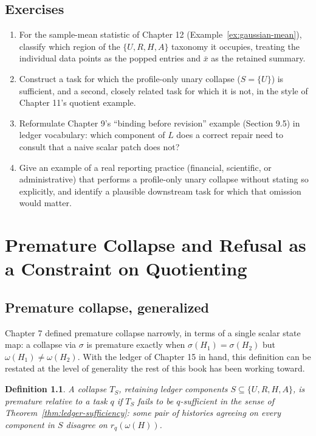 \documentclass[11pt]{book}
\newtheorem{definition}[theorem]{Definition}
\begin{document}
\section*{Exercises}
\begin{enumerate}
\item For the sample-mean statistic of Chapter 12 (Example~\ref{ex:gaussian-mean}), classify which region of the $\{U,R,H,A\}$ taxonomy it occupies, treating the individual data points as the popped entries and $\bar x$ as the retained summary.
\item Construct a task for which the profile-only unary collapse ($S=\{U\}$) is sufficient, and a second, closely related task for which it is not, in the style of Chapter 11's quotient example.
\item Reformulate Chapter 9's ``binding before revision'' example (Section 9.5) in ledger vocabulary: which component of $L$ does a correct repair need to consult that a naive scalar patch does not?
\item Give an example of a real reporting practice (financial, scientific, or administrative) that performs a profile-only unary collapse without stating so explicitly, and identify a plausible downstream task for which that omission would matter.
\end{enumerate}

\chapter{Premature Collapse and Refusal as a Constraint on Quotienting}

\section{Premature collapse, generalized}

Chapter 7 defined premature collapse narrowly, in terms of a single scalar state map: a collapse via $\sigma$ is premature exactly when $\sigma(H_1)=\sigma(H_2)$ but $\omega(H_1)\ne\omega(H_2)$. With the ledger of Chapter 15 in hand, this definition can be restated at the level of generality the rest of this book has been working toward.

\begin{definition}
A collapse $T_S$, retaining ledger components $S\subseteq\{U,R,H,A\}$, is \emph{premature relative to a task $q$} if $T_S$ fails to be $q$-sufficient in the sense of Theorem~\ref{thm:ledger-sufficiency}: some pair of histories agreeing on every component in $S$ disagree on $r_q(\omega(H))$.
\end{definition}
\end{document}
